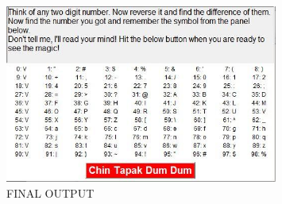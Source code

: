 \documentclass[a4paper,12pt]{article}
\begin{document}
\begin{figure}[h!]
    \centering
    \includegraphics[width=0.8\textwidth]{output.jpeg} %
    \caption{FINAL OUTPUT}
\end{figure}

\vspace{0.5cm}
\newpage
\end{document}

